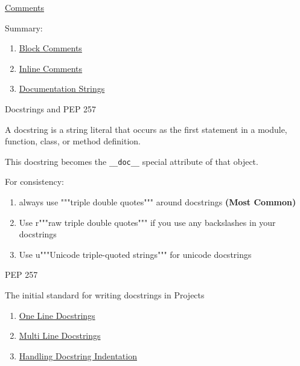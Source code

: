 \documentclass{beamer}
\begin{document}
\begin{frame}{\href{https://www.python.org/dev/peps/pep-0008/\#comments}{Comments}}

Summary:

\begin{enumerate}
\item \href{https://www.python.org/dev/peps/pep-0008/\#block-comments}{Block Comments}
\item \href{https://www.python.org/dev/peps/pep-0008/\#inline-comments}{Inline Comments}
\item \href{https://www.python.org/dev/peps/pep-0008/\#documentation-strings}{Documentation Strings}
\end{enumerate}

\end{frame}



\begin{frame}{Docstrings and PEP 257}

A docstring is a string literal that occurs as the first statement in a module, function, class, 
or method definition. 

This docstring becomes the \texttt{__doc__} special attribute of that object.

  For consistency:

  \begin{enumerate}
    \item always use """triple double quotes""" around docstrings \textbf{(Most Common)}
    \item Use r"""raw triple double quotes""" if you use any backslashes in your docstrings 
    \item Use u"""Unicode triple-quoted strings""" for unicode docstrings
  \end{enumerate}

\end{frame}

\begin{frame}{PEP 257}

The initial standard for writing docstrings in Projects

\begin{enumerate}
\item \href{https://www.python.org/dev/peps/pep-0257/\#one-line-docstrings}{One Line Docstrings}
\item \href{https://www.python.org/dev/peps/pep-0257/\#multi-line-docstrings}{Multi Line Docstrings}
\item \href{https://www.python.org/dev/peps/pep-0257/\#handling-docstring-indentation}{Handling Docstring Indentation}
\end{enumerate}

\end{frame}
\end{document}
